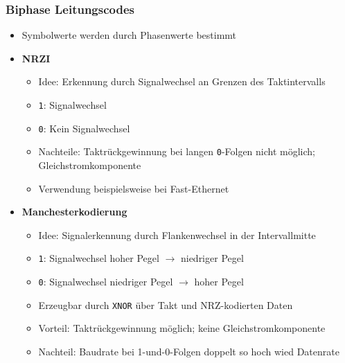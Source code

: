 \subsubsection{Biphase Leitungscodes}
\begin{itemize}
	\item Symbolwerte werden durch Phasenwerte bestimmt
	\item \textbf{NRZI}
	\begin{itemize}
		\item Idee: Erkennung durch Signalwechsel an Grenzen des Taktintervalls
		\item \texttt{1}: Signalwechsel
		\item \texttt{0}: Kein Signalwechsel
		\item Nachteile: Taktrückgewinnung bei langen \texttt{0}-Folgen nicht möglich; Gleichstromkomponente
		\item Verwendung beispielsweise bei Fast-Ethernet
	\end{itemize}
	\item \textbf{Manchesterkodierung}
	\begin{itemize}
		\item Idee: Signalerkennung durch Flankenwechsel in der Intervallmitte
		\item \texttt{1}: Signalwechsel hoher Pegel \(\rightarrow\) niedriger Pegel
		\item \texttt{0}: Signalwechsel niedriger Pegel \(\rightarrow\) hoher Pegel
		\item Erzeugbar durch \texttt{XNOR} über Takt und NRZ-kodierten Daten
		\item Vorteil: Taktrückgewinnung möglich; keine Gleichstromkomponente
		\item Nachteil: Baudrate bei 1-und-0-Folgen doppelt so hoch wied Datenrate
	\end{itemize}
\end{itemize}

